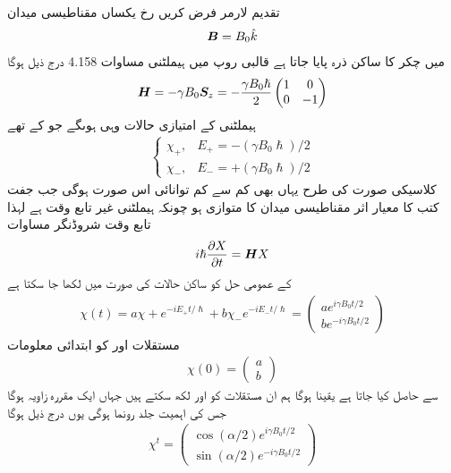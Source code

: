 تقدیم لارمر فرض کریں  رخ  یکساں مقناطیسی میدان 
\begin{align}
{\ensuremath{{\boldsymbol{B}}}} = B_0 \hat{k}
\end{align}
میں  چکر کا ساکن ذرہ پایا جاتا ہے قالبی روپ میں ہیملٹنی مساوات 4.158 درج ذیل ہوگا 
\begin{align}
{\ensuremath{{\boldsymbol{H}}}} = - \gamma B_0 {{\boldsymbol{S}}}_z = - \frac{\gamma B_0 \hslash}{2}
\begin{pmatrix}
1 & 0 \\
0 & -1
\end{pmatrix}
\end{align}
ہیملٹنی  کے امتیازی حالات وہی ہوںگے جو  کے تھے 
\begin{align}
\begin{cases}
\chi_{+} , & E_{+} = - (\gamma B_0 \hslash)/2 \\
\chi_{-} , & E_{-} = + (\gamma B_0 \hslash)/2
\end{cases}
\end{align}
کلاسیکی صورت کی طرح یہاں بھی کم سے کم توانائی اس صورت ہوگی جب جفت کتب کا معیار اثر مقناطیسی میدان کا متوازی ہو چونکہ ہیملٹنی غیر تابع وقت ہے لہذا تابع وقت شروڈنگر مساوات 
\begin{align}
i \hslash \frac{\partial X}{\partial t} = {{\boldsymbol{H}}} X
\end{align}
کے عمومی حل کو ساکن حالات کی صورت میں لکھا جا سکتا ہے 
\begin{align*}
\chi (t) = a \chi + e^{- i E_{+} t/\hslash} + b \chi_{-} e^{- i E_{-} t / \hslash} = 
\begin{pmatrix}
a e^{i \gamma B_0 t /2} \\
b e^{- i \gamma B_0 t/2}
\end{pmatrix}
\end{align*}
مستقلات  اور  کو ابتدائی معلومات 
\begin{align*}
\chi (0) = 
\begin{pmatrix}
a \\
b
\end{pmatrix}
\end{align*}
سے حاصل کیا جاتا ہے یقینا  ہوگا ہم ان مستقلات کو  اور  لکھ سکتے ہیں جہاں  ایک مقررہ زاویہ ہوگا جس کی اہمیت جلد رونما ہوگی یوں درج ذیل ہوگا 
\begin{align}
\chi^{t} = 
\begin{pmatrix}
\cos (\alpha/2) e^{i \gamma B_0 t/2} \\
\sin (\alpha/2) e^{- i \gamma B_0 t /2}
\end{pmatrix}
\end{align}
